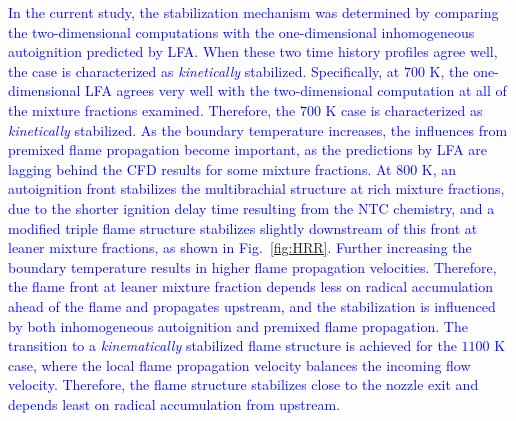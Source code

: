 \documentclass[review,3p,times]{elsarticle}
\begin{document}
\textcolor{blue}{In the current study, the stabilization mechanism was determined by comparing the two-dimensional computations with the one-dimensional inhomogeneous autoignition predicted by LFA.  When these two time history profiles agree well, the case is characterized as \emph{kinetically} stabilized.  Specifically, at $700$ K, the one-dimensional LFA agrees very well with the two-dimensional computation at all of the mixture fractions examined.  Therefore, the $700$ K case is characterized as \emph{kinetically} stabilized.  As the boundary temperature increases, the influences from premixed flame propagation become important, as the predictions by LFA are lagging behind the CFD results for some mixture fractions.  At $800$ K, an autoignition front stabilizes the multibrachial structure at rich mixture fractions, due to the shorter ignition delay time resulting from the NTC chemistry, and a modified triple flame structure stabilizes slightly downstream of this front at leaner mixture fractions, as shown in Fig.~\ref{fig:HRR}.  Further increasing the boundary temperature results in higher flame propagation velocities.  Therefore, the flame front at leaner mixture fraction depends less on radical accumulation ahead of the flame and propagates upstream, and the stabilization is influenced by both inhomogeneous autoignition and premixed flame propagation.  The transition to a \emph {kinematically} stabilized flame structure is achieved for the $1100$ K case, where the local flame propagation velocity balances the incoming flow velocity.  Therefore, the flame structure stabilizes close to the nozzle exit and depends least on radical accumulation from upstream.}

\end{document}
